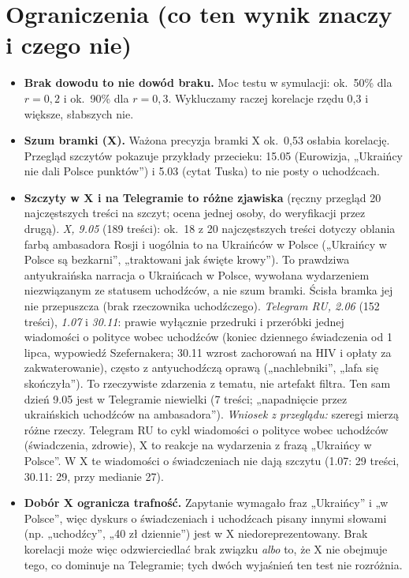 \documentclass[10pt,a4paper]{article}
\begin{document}
\section{Ograniczenia (co ten wynik znaczy i czego nie)}
\begin{itemize}
\item \textbf{Brak dowodu to nie dowód braku.} Moc testu w symulacji: ok.\ 50\% dla $r=0{,}2$ i ok.\ 90\% dla $r=0{,}3$. Wykluczamy raczej korelacje rzędu 0,3 i większe, słabszych nie.
\item \textbf{Szum bramki (X).} Ważona precyzja bramki X ok.\ 0,53 osłabia korelację. Przegląd szczytów pokazuje przykłady przecieku: 15.05 (Eurowizja, „Ukraińcy nie dali Polsce punktów”) i 5.03 (cytat Tuska) to nie posty o uchodźcach.
\item \textbf{Szczyty w X i na Telegramie to różne zjawiska} (ręczny przegląd 20 najczęstszych treści na szczyt; ocena jednej osoby, do weryfikacji przez drugą).
 \emph{X, 9.05} (189 treści): ok.\ 18 z 20 najczęstszych treści dotyczy oblania farbą ambasadora Rosji i uogólnia to na Ukraińców w Polsce („Ukraińcy w Polsce są bezkarni”, „traktowani jak święte krowy”). To prawdziwa antyukraińska narracja o Ukraińcach w Polsce, wywołana wydarzeniem niezwiązanym ze statusem uchodźców, a nie szum bramki. Ścisła bramka jej nie przepuszcza (brak rzeczownika uchodźczego).
 \emph{Telegram RU, 2.06} (152 treści), \emph{1.07} i \emph{30.11}: prawie wyłącznie przedruki i przeróbki jednej wiadomości o polityce wobec uchodźców (koniec dziennego świadczenia od 1 lipca, wypowiedź Szefernakera; 30.11 wzrost zachorowań na HIV i opłaty za zakwaterowanie), często z antyuchodźczą oprawą („nachlebniki”, „lafa się skończyła”). To rzeczywiste zdarzenia z tematu, nie artefakt filtra. Ten sam dzień 9.05 jest w Telegramie niewielki (7 treści; „napadnięcie przez ukraińskich uchodźców na ambasadora”).
 \emph{Wniosek z przeglądu:} szeregi mierzą różne rzeczy. Telegram RU to cykl wiadomości o polityce wobec uchodźców (świadczenia, zdrowie), X to reakcje na wydarzenia z frazą „Ukraińcy w Polsce”. W X te wiadomości o świadczeniach nie dają szczytu (1.07: 29 treści, 30.11: 29, przy medianie 27).
\item \textbf{Dobór X ogranicza trafność.} Zapytanie wymagało fraz „Ukraińcy” i „w Polsce”, więc dyskurs o świadczeniach i uchodźcach pisany innymi słowami (np. „uchodźcy”, „40 zł dziennie”) jest w X niedoreprezentowany. Brak korelacji może więc odzwierciedlać brak związku \emph{albo} to, że X nie obejmuje tego, co dominuje na Telegramie; tych dwóch wyjaśnień ten test nie rozróżnia.

\end{itemize}
\end{document}
